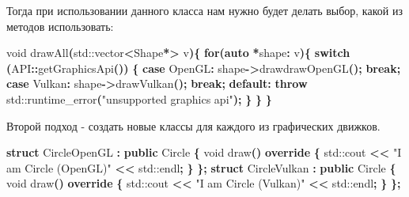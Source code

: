 \documentclass[14pt,a4paper]{article}
\newenvironment{Shaded}{\begin{paragraph}}{\end{paragraph}}
\newenvironment{Highlighting}{\begin{paragraph}}{\end{paragraph}}
\newcommand{\KeywordTok}[1]{\textcolor[rgb]{0.13,0.29,0.53}{\textbf{#1}}}
\newcommand{\DataTypeTok}[1]{\textcolor[rgb]{0.13,0.29,0.53}{#1}}
\newcommand{\StringTok}[1]{\textcolor[rgb]{0.31,0.60,0.02}{#1}}
\newcommand{\ControlFlowTok}[1]{\textcolor[rgb]{0.13,0.29,0.53}{\textbf{#1}}}
\newcommand{\OperatorTok}[1]{\textcolor[rgb]{0.81,0.36,0.00}{\textbf{#1}}}
\newcommand{\BuiltInTok}[1]{#1}
\newcommand{\NormalTok}[1]{#1}
\begin{document}
Тогда при использовании данного класса нам нужно будет делать выбор,
какой из методов использовать:

\begin{Shaded}
\begin{Highlighting}[]
\DataTypeTok{void}\NormalTok{ drawAll}\OperatorTok{(}\BuiltInTok{std::}\NormalTok{vector}\OperatorTok{\textless{}}\NormalTok{Shape}\OperatorTok{*\textgreater{}}\NormalTok{ v}\OperatorTok{)\{}
    \ControlFlowTok{for}\OperatorTok{(}\KeywordTok{auto} \OperatorTok{*}\NormalTok{shape}\OperatorTok{:}\NormalTok{ v}\OperatorTok{)\{}
        \ControlFlowTok{switch} \OperatorTok{(}\NormalTok{API}\OperatorTok{::}\NormalTok{getGraphicsApi}\OperatorTok{())} \OperatorTok{\{}
            \ControlFlowTok{case}\NormalTok{ OpenGL}\OperatorTok{:}
\NormalTok{                shape}\OperatorTok{{-}\textgreater{}}\NormalTok{drawdrawOpenGL}\OperatorTok{();}
                \ControlFlowTok{break}\OperatorTok{;}
            \ControlFlowTok{case}\NormalTok{ Vulkan}\OperatorTok{:}
\NormalTok{                shape}\OperatorTok{{-}\textgreater{}}\NormalTok{drawVulkan}\OperatorTok{();}
                \ControlFlowTok{break}\OperatorTok{;}
            \ControlFlowTok{default}\OperatorTok{:}
                \ControlFlowTok{throw} \BuiltInTok{std::}\NormalTok{runtime\_error}\OperatorTok{(}\StringTok{"unsupported graphics api"}\OperatorTok{);}
        \OperatorTok{\}}
    \OperatorTok{\}}
\OperatorTok{\}}
\end{Highlighting}
\end{Shaded}

Второй подход - создать новые классы для каждого из графических движков.

\begin{Shaded}
\begin{Highlighting}[]
\KeywordTok{struct}\NormalTok{ CircleOpenGL }\OperatorTok{:} \KeywordTok{public}\NormalTok{ Circle }\OperatorTok{\{}
    \DataTypeTok{void}\NormalTok{ draw}\OperatorTok{()} \KeywordTok{override} \OperatorTok{\{}
        \BuiltInTok{std::}\NormalTok{cout}\OperatorTok{ \textless{}\textless{}} \StringTok{"I am Circle (OpenGL)"} \OperatorTok{\textless{}\textless{}} \BuiltInTok{std::}\NormalTok{endl}\OperatorTok{;}
    \OperatorTok{\}}
\OperatorTok{\};}
\KeywordTok{struct}\NormalTok{ CircleVulkan }\OperatorTok{:} \KeywordTok{public}\NormalTok{ Circle }\OperatorTok{\{}
    \DataTypeTok{void}\NormalTok{ draw}\OperatorTok{()} \KeywordTok{override} \OperatorTok{\{}
        \BuiltInTok{std::}\NormalTok{cout}\OperatorTok{ \textless{}\textless{}} \StringTok{"I am Circle (Vulkan)"} \OperatorTok{\textless{}\textless{}} \BuiltInTok{std::}\NormalTok{endl}\OperatorTok{;}
    \OperatorTok{\}}
\OperatorTok{\};}
\end{Highlighting}
\end{Shaded}
\end{document}
